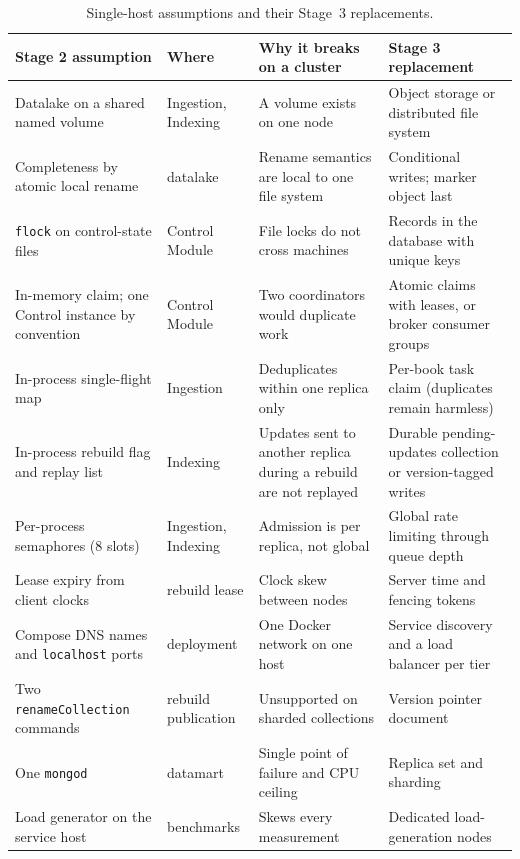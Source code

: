 \documentclass[10pt,a4paper]{article}
\newcommand{\code}[1]{\texttt{#1}}
\begin{document}
\begin{table}[htbp]
  \centering
  \footnotesize
  \caption{Single-host assumptions and their Stage~3 replacements.}
  \label{tab:local-assumptions}
  \begin{tabularx}{\textwidth}{@{}>{\raggedright\arraybackslash}p{3.6cm}>{\raggedright\arraybackslash}p{2.5cm}>{\raggedright\arraybackslash}X>{\raggedright\arraybackslash}p{4.0cm}@{}}
    \toprule
    Stage 2 assumption & Where & Why it breaks on a cluster & Stage 3 replacement \\
    \midrule
    Datalake on a shared named volume & Ingestion, Indexing & A volume exists on
      one node & Object storage or distributed file system \\
    Completeness by atomic local rename & datalake & Rename semantics are local
      to one file system & Conditional writes; marker object last \\
    \code{flock} on control-state files & Control Module & File locks do not
      cross machines & Records in the database with unique keys \\
    In-memory claim; one Control instance by convention & Control Module &
      Two coordinators would duplicate work & Atomic claims with leases, or broker
      consumer groups \\
    In-process single-flight map & Ingestion & Deduplicates within one replica
      only & Per-book task claim (duplicates remain harmless) \\
    In-process rebuild flag and replay list & Indexing & Updates sent to another
      replica during a rebuild are not replayed & Durable pending-updates
      collection or version-tagged writes \\
    Per-process semaphores (8 slots) & Ingestion, Indexing & Admission is per
      replica, not global & Global rate limiting through queue depth \\
    Lease expiry from client clocks & rebuild lease & Clock skew between nodes &
      Server time and fencing tokens \\
    Compose DNS names and \code{localhost} ports & deployment & One Docker
      network on one host & Service discovery and a load balancer per tier \\
    Two \code{renameCollection} commands & rebuild publication & Unsupported on
      sharded collections & Version pointer document \\
    One \code{mongod} & datamart & Single point of failure and CPU ceiling &
      Replica set and sharding \\
    Load generator on the service host & benchmarks & Skews every measurement &
      Dedicated load-generation nodes \\
    \bottomrule
  \end{tabularx}
\end{table}
\end{document}
